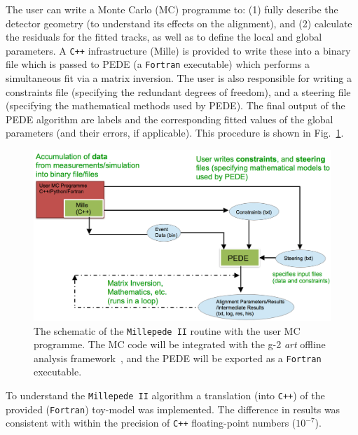 \documentclass[a4paper,11pt]{article}
\begin{document}
The user can write a Monte Carlo (MC) programme to: (1) fully describe the detector geometry (to understand its effects on the alignment), and (2) calculate the residuals for the fitted tracks, as well as to define the local and global parameters. A \texttt{C++} infrastructure (Mille) is provided to write these into a binary file which is passed to PEDE (a \texttt{Fortran} executable) which performs a simultaneous fit via a matrix inversion. The user is also responsible for writing a constraints file (specifying the redundant degrees of freedom), and a steering file (specifying the mathematical methods used by PEDE). The final output of the PEDE algorithm are labels and the corresponding fitted values of the global parameters (and their errors, if applicable). This procedure is shown in Fig.~\ref{fig:mp2}.
\begin{figure}[!ht]
	\centering
	\includegraphics[scale = 0.4]{fig/MP2.png}
	\caption{The schematic of the \texttt{Millepede II} routine with the user MC programme. The MC code will be integrated with the g-2 \textit{art} offline analysis framework~\cite{art}, and the PEDE will be exported as a \texttt{Fortran} executable.}
	\label{fig:mp2}
\end{figure}
\vspace{-0.2cm}

To understand the \texttt{Millepede II} algorithm a translation (into \texttt{C++}) of the provided (\texttt{Fortran}) toy-model was implemented. The difference in results was consistent with within the precision of \texttt{C++} floating-point numbers ($10^{-7}$).
\vspace{-0.1cm}
\end{document}
